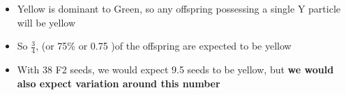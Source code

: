 \documentclass{beamer}
\begin{document}
\begin{frame}
\begin{columns}
	\begin{column}{0.7\textwidth}
\begin{itemize}
\item Yellow is dominant to Green, so any offspring possessing a single Y particle will be yellow
\item So $\frac{3}{4}$, (or 75\% or 0.75 )of the offspring are expected to be yellow
\item With 38 F2 seeds, we would expect 9.5 seeds to be yellow, but \textbf{we would also expect variation around this number}

\end{itemize}
	\end{column}
	\end{columns}
	
	
\end{frame}
\end{document}
